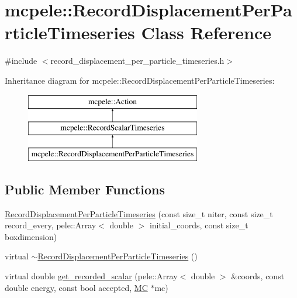 \hypertarget{classmcpele_1_1RecordDisplacementPerParticleTimeseries}{\section{mcpele\-:\-:\-Record\-Displacement\-Per\-Particle\-Timeseries \-Class \-Reference}
\label{classmcpele_1_1RecordDisplacementPerParticleTimeseries}
}


{\ttfamily \#include $<$record\-\_\-displacement\-\_\-per\-\_\-particle\-\_\-timeseries.\-h$>$}

\-Inheritance diagram for mcpele\-:\-:\-Record\-Displacement\-Per\-Particle\-Timeseries\-:\begin{figure}[H]
\begin{center}
\leavevmode
\includegraphics[height=3.000000cm]{classmcpele_1_1RecordDisplacementPerParticleTimeseries}
\end{center}
\end{figure}
\subsection*{\-Public \-Member \-Functions}
\begin{DoxyCompactItemize}
\item 
\hyperlink{classmcpele_1_1RecordDisplacementPerParticleTimeseries_a43afba63785193f65c9db66b040ed6d8}{\-Record\-Displacement\-Per\-Particle\-Timeseries} (const size\-\_\-t niter, const size\-\_\-t record\-\_\-every, pele\-::\-Array$<$ double $>$ initial\-\_\-coords, const size\-\_\-t boxdimension)
\item 
virtual \hyperlink{classmcpele_1_1RecordDisplacementPerParticleTimeseries_add341ebe1011d36c53df06ddc256fdbf}{$\sim$\-Record\-Displacement\-Per\-Particle\-Timeseries} ()
\item 
virtual double \hyperlink{classmcpele_1_1RecordDisplacementPerParticleTimeseries_ac049afa25de4847b76910680cb3f1a10}{get\-\_\-recorded\-\_\-scalar} (pele\-::\-Array$<$ double $>$ \&coords, const double energy, const bool accepted, \hyperlink{classmcpele_1_1MC}{\-M\-C} $\ast$mc)
\end{DoxyCompactItemize}


